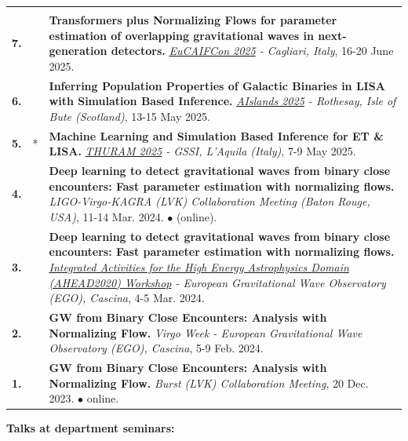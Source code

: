 {\begin{longtable}{rp{0.3cm}p{15.8cm}}
\vspace{0.05cm}\\
%
\textbf{7.} &  & \textbf{Transformers plus Normalizing Flows for parameter estimation of overlapping gravitational waves in next-generation detectors.}
\newline{}
\textit{\href{https://agenda.infn.it/event/43565/overview/}{EuCAIFCon 2025} - Cagliari, Italy}, 16-20 June 2025.
\vspace{0.05cm}\\
%
\textbf{6.} &  & \textbf{Inferring Population Properties of Galactic Binaries in LISA with Simulation Based Inference.}
\newline{}
\textit{\href{https://uofgravity.github.io/aislands/}{AIslands 2025} - Rothesay, Isle of Bute (Scotland)}, 13-15 May 2025.
\vspace{0.05cm}\\
%
\textbf{5.} & * & \textbf{Machine Learning and Simulation Based Inference for ET \& LISA.}
\newline{}
\textit{\href{https://davidegerosa.com/thuram/}{THURAM 2025} - GSSI, L'Aquila (Italy)}, 7-9 May 2025.
\vspace{0.05cm}\\
%
\textbf{4.} &  & \textbf{Deep learning to detect gravitational waves from binary close encounters: Fast parameter estimation with normalizing flows.}
\newline{}
\textit{LIGO-Virgo-KAGRA (LVK) Collaboration Meeting (Baton Rouge, USA)}, 11-14 Mar. 2024.
\newline{}
\textcolor{color1}{$\bullet$} (online).
\vspace{0.05cm}\\
%
\textbf{3.} &  & \textbf{Deep learning to detect gravitational waves from binary close encounters: Fast parameter estimation with normalizing flows.}
\newline{}
\textit{\href{https://indico.ego-gw.it/event/666/overview}{Integrated Activities for the High Energy Astrophysics Domain (AHEAD2020) Workshop} - European Gravitational Wave Observatory (EGO), Cascina}, 4-5 Mar. 2024.
\vspace{0.05cm}\\
%
\textbf{2.} &  & \textbf{GW from Binary Close Encounters: Analysis with Normalizing Flow.}
\newline{}
\textit{Virgo Week - European Gravitational Wave Observatory (EGO), Cascina}, 5-9 Feb. 2024.
\vspace{0.05cm}\\
%
\textbf{1.} &  & \textbf{GW from Binary Close Encounters: Analysis with Normalizing Flow.}
\newline{}
\textit{Burst (LVK) Collaboration Meeting}, 20 Dec. 2023.
\newline{}
\textcolor{color1}{$\bullet$} online.
\vspace{0.05cm}\\
%
\end{longtable} }
\textcolor{color1}{\textbf{Talks at department seminars:}}
\vspace{-0.5cm}

